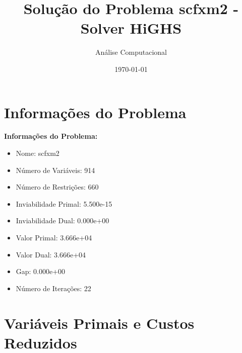 \documentclass[12pt]{article}
\title{Solução do Problema scfxm2 - Solver HiGHS}
\author{Análise Computacional}
\date{\today}
\begin{document}
\maketitle

\section{Informações do Problema}

\textbf{Informações do Problema:}
\begin{itemize}
\item Nome: scfxm2
\item Número de Variáveis: 914
\item Número de Restrições: 660
\item Inviabilidade Primal: 5.500e-15
\item Inviabilidade Dual: 0.000e+00
\item Valor Primal: 3.666e+04
\item Valor Dual: 3.666e+04
\item Gap: 0.000e+00
\item Número de Iterações: 22
\end{itemize}


\section{Variáveis Primais e Custos Reduzidos}
\end{document}
